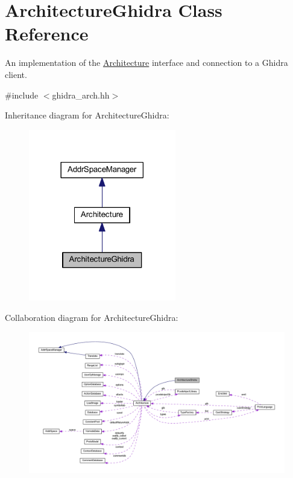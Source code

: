 \hypertarget{class_architecture_ghidra}{}\section{Architecture\+Ghidra Class Reference}
\label{class_architecture_ghidra}


An implementation of the \mbox{\hyperlink{class_architecture}{Architecture}} interface and connection to a Ghidra client.  




{\ttfamily \#include $<$ghidra\+\_\+arch.\+hh$>$}



Inheritance diagram for Architecture\+Ghidra\+:
\nopagebreak
\begin{figure}[H]
\begin{center}
\leavevmode
\includegraphics[width=182pt]{class_architecture_ghidra__inherit__graph}
\end{center}
\end{figure}


Collaboration diagram for Architecture\+Ghidra\+:
\nopagebreak
\begin{figure}[H]
\begin{center}
\leavevmode
\includegraphics[width=350pt]{class_architecture_ghidra__coll__graph}
\end{center}
\end{figure}
